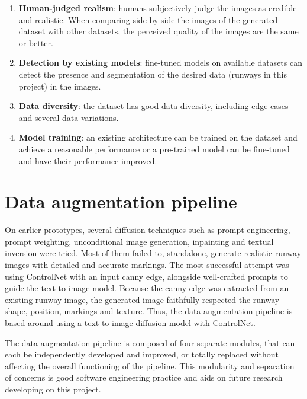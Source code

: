 \begin{enumerate}
    \item \textbf{Human-judged realism}: humans subjectively judge the images as credible and realistic. When comparing side-by-side the images of the generated dataset with other datasets, the perceived quality of the images are the same or better.
    \item \textbf{Detection by existing models}: fine-tuned models on available datasets can detect the presence and segmentation of the desired data (runways in this project) in the images.
    \item \textbf{Data diversity}: the dataset has good data diversity, including edge cases and several data variations.
    \item \textbf{Model training}: an existing architecture can be trained on the dataset and achieve a reasonable performance or a pre-trained model can be fine-tuned and have their performance improved.
\end{enumerate}

\section{Data augmentation pipeline}

On earlier prototypes, several diffusion techniques such as prompt engineering, prompt weighting, unconditional image generation, inpainting and textual inversion were tried. Most of them failed to, standalone, generate realistic runway images with detailed and accurate markings. The most successful attempt was using ControlNet with an input canny edge, alongside well-crafted prompts to guide the text-to-image model. Because the canny edge was extracted from an existing runway image, the generated image faithfully respected the runway shape, position, markings and texture. Thus, the data augmentation pipeline is based around using a text-to-image diffusion model with ControlNet.

The data augmentation pipeline is composed of four separate modules, that can each be independently developed and improved, or totally replaced without affecting the overall functioning of the pipeline. This modularity and separation of concerns is good software engineering practice and aids on future research developing on this project.

